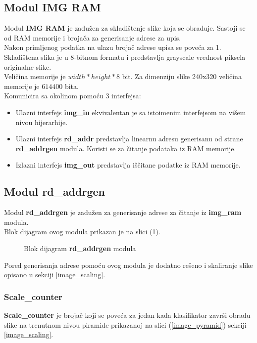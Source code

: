 \subsection{Modul IMG RAM}

Modul \textbf{IMG RAM} je zadužen za skladištenje slike koja se obrađuje.
Sastoji se od RAM memorije i brojača za generisanje adrese za upis. \\
Nakon primljenog podatka na ulazu brojač adrese upisa se poveća za 1. \\
Skladištena slika je u 8-bitnom formatu i predstavlja grayscale vrednost piksela
originalne slike. \\
Veličina memorije je $width*height*8$ bit. Za dimenziju slike 240x320
veličina memorije je $614400$ bita. \\

Komunicira sa okolinom pomoću 3 interfejsa:
\begin{itemize}
  \item Ulazni interfejs \textbf{img\_in} ekvivalentan je sa istoimenim
    interfejsom na višem nivou hijerarhije.
  \item Ulazni interfejs \textbf{rd\_addr} predstavlja linearnu adresu
    generisanu od strane \textbf{rd\_addrgen} modula. Koristi se za čitanje
    podataka iz RAM memorije.
  \item Izlazni interfejs \textbf{img\_out} predstavlja iščitane podatke iz RAM memorije.
\end{itemize}

\subsection{Modul rd\_addrgen}

Modul \textbf{rd\_addrgen} je zadužen za generisanje adrese za čitanje iz
\textbf{img\_ram} modula. \\
Blok dijagram ovog modula prikazan je na slici (\ref{rd_addrgen_bd}). \\

\begin{figure}[H]
    
\caption{Blok dijagram \textbf{rd\_addrgen} modula}
\label{rd_addrgen_bd}
\end{figure}

Pored generisanja adrese pomoću ovog modula je dodatno rešeno i skaliranje slike opisano u sekciji
\ref{image_scaling}. \\

\subsubsection{Scale\_counter}\label{scale_counter_sec}
\textbf{Scale\_counter} je brojač koji se poveća za jedan kada klasifikator
završi obradu slike na trenutnom nivou piramide prikazanoj na slici
(\ref{image_pyramid}) sekciji \ref{image_scaling}. \\

